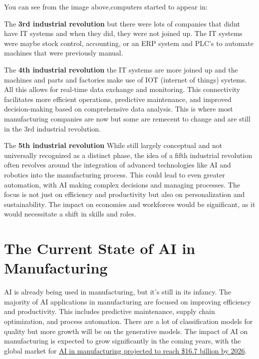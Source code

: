 \documentclass[
  letterpaper,
  DIV=11,
  numbers=noendperiod]{scrartcl}
\begin{document}
You can see from the image above,computers started to appear in:

The \textbf{3rd industrial revolution} but there were lots of companies
that didnt have IT systems and when they did, they were not joined up.
The IT systems were maybe stock control, accounting, or an ERP system
and PLC's to automate machines that were previously manual.

The \textbf{4th industrial revolution} the IT systems are more joined up
and the machines and parts and factories make use of IOT (internet of
things) systems. All this allows for real-time data exchange and
monitoring. This connectivity facilitates more efficient operations,
predictive maintenance, and improved decision-making based on
comprehensive data analysis. This is where most manufacturing companies
are now but some are remecent to change and are still in the 3rd
industrial revolution.

The \textbf{5th industrial revolution} While still largely conceptual
and not universally recognized as a distinct phase, the idea of a fifth
industrial revolution often revolves around the integration of advanced
technologies like AI and robotics into the manufacturing process. This
could lead to even greater automation, with AI making complex decisions
and managing processes. The focus is not just on efficiency and
productivity but also on personalization and sustainability. The impact
on economies and workforces would be significant, as it would
necessitate a shift in skills and roles.

\hypertarget{the-current-state-of-ai-in-manufacturing}{%
\section{The Current State of AI in
Manufacturing}\label{the-current-state-of-ai-in-manufacturing}}

AI is already being used in manufacturing, but it's still in its
infancy. The majority of AI applications in manufacturing are focused on
improving efficiency and productivity. This includes predictive
maintenance, supply chain optimization, and process automation. There
are a lot of classification models for quality but more growth will be
on the generative models. The impact of AI on manufacturing is expected
to grow significantly in the coming years, with the global market for
\href{https://www.businesswire.com/news/home/20221103005709/en/16.3-Billion-Worldwide-Artificial-Intelligence-in-Manufacturing-Industry-to-2027---Featuring-Bright-Machines-Cisco-Systems-Flutura-and-General-Vision-Among-Others---ResearchAndMarkets.com}{AI
in manufacturing projected to reach \$16.7 billion by 2026}.
\end{document}
